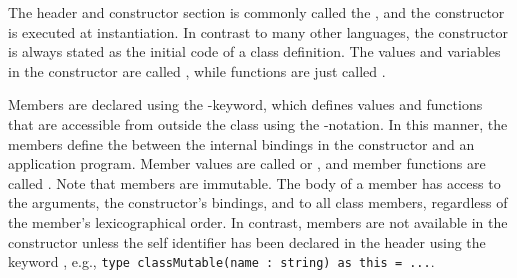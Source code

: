The header and constructor section is commonly called the , and the constructor is executed at instantiation. In contrast to many other languages, the constructor is always stated as the initial code of a class definition.
The values and variables in the constructor are called , while functions are just called .

Members are declared using the -keyword, which defines values and functions that are accessible from outside the class using the -notation. In this manner, the members define the  between the internal bindings in the constructor and an application program. Member values are called  or , and
member functions are called . Note that members are immutable.
The body of a member has access to the arguments, the constructor's bindings, and to all class members, regardless of the member's lexicographical order. 
In contrast, members are not available in the constructor unless the self identifier has been declared in the header using the keyword , e.g., \lstinline{type classMutable(name : string) as this = ...}.

